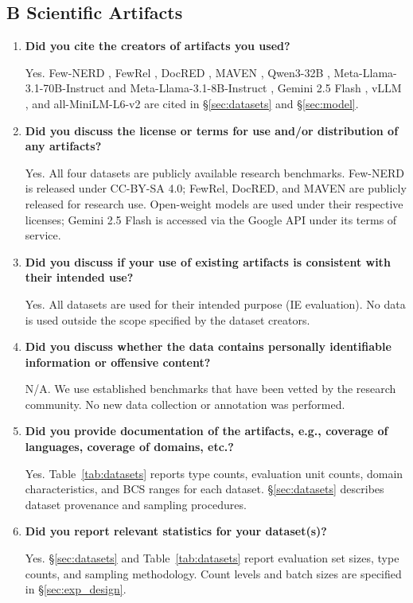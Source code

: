 \subsection*{B \quad Scientific Artifacts}

\begin{enumerate}[label=\textbf{B\arabic*.},leftmargin=*,itemsep=4pt]

\item \textbf{Did you cite the creators of artifacts you used?}

Yes. Few-NERD \citep{fewnerd-2021}, FewRel \citep{fewrel-2018}, DocRED \citep{docred-2019}, MAVEN \citep{maven-2020}, Qwen3-32B \citep{qwen3-2025}, Meta-Llama-3.1-70B-Instruct and Meta-Llama-3.1-8B-Instruct \citep{llama3-2024}, Gemini 2.5 Flash \citep{gemini-2025}, vLLM \citep{vllm-2023}, and all-MiniLM-L6-v2 \citep{minilm-2020} are cited in \S\ref{sec:datasets} and \S\ref{sec:model}.

\item \textbf{Did you discuss the license or terms for use and/or distribution of any artifacts?}

Yes. All four datasets are publicly available research benchmarks. Few-NERD is released under CC-BY-SA 4.0; FewRel, DocRED, and MAVEN are publicly released for research use. Open-weight models are used under their respective licenses; Gemini 2.5 Flash is accessed via the Google API under its terms of service.

\item \textbf{Did you discuss if your use of existing artifacts is consistent with their intended use?}

Yes. All datasets are used for their intended purpose (IE evaluation). No data is used outside the scope specified by the dataset creators.

\item \textbf{Did you discuss whether the data contains personally identifiable information or offensive content?}

N/A. We use established benchmarks that have been vetted by the research community. No new data collection or annotation was performed.

\item \textbf{Did you provide documentation of the artifacts, e.g., coverage of languages, coverage of domains, etc.?}

Yes. Table~\ref{tab:datasets} reports type counts, evaluation unit counts, domain characteristics, and BCS ranges for each dataset. \S\ref{sec:datasets} describes dataset provenance and sampling procedures.

\item \textbf{Did you report relevant statistics for your dataset(s)?}

Yes. \S\ref{sec:datasets} and Table~\ref{tab:datasets} report evaluation set sizes, type counts, and sampling methodology. Count levels and batch sizes are specified in \S\ref{sec:exp_design}.

\end{enumerate}

